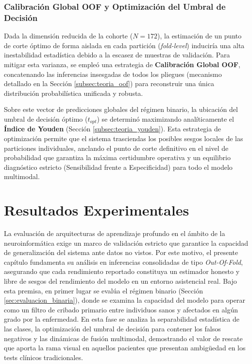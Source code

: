 \documentclass[12pt, oneside, english, spanish]{book}
\begin{document}
\subsection{Calibración Global OOF y Optimización del Umbral de Decisión} \label{subsec:calibracion_binaria}

Dada la dimensión reducida de la cohorte ($N=172$), la estimación de un punto de corte óptimo de forma aislada en cada partición (\textit{fold-level}) induciría una alta inestabilidad estadística debido a la escasez de muestras de validación. Para mitigar esta varianza, se empleó una estrategia de \textbf{Calibración Global OOF}, concatenando las inferencias insesgadas de todos los pliegues (mecanismo detallado en la Sección \ref{subsec:teoria_oof}) para reconstruir una única distribución probabilística unificada y robusta.

Sobre este vector de predicciones globales del régimen binario, la ubicación del umbral de decisión óptimo ($t_{opt}$) se determinó maximizando analíticamente el \textbf{Índice de Youden} (Sección \ref{subsec:teoria_youden}). Esta estrategia de optimización permite que el sistema trasciendas los posibles sesgos locales de las particiones individuales, anclando el punto de corte definitivo en el nivel de probabilidad que garantiza la máxima certidumbre operativa y un equilibrio diagnóstico estricto (Sensibilidad frente a Especificidad) para todo el modelo multimodal.

\chapter{Resultados Experimentales} \label{chap:resultados}

La evaluación de arquitecturas de aprendizaje profundo en el ámbito de la neuroinformática exige un marco de validación estricto que garantice la capacidad de generalización del sistema ante datos no vistos. Por este motivo, el presente capítulo fundamenta su análisis en inferencias consolidadas de tipo \textit{Out-Of-Fold}, asegurando que cada rendimiento reportado constituya un estimador honesto y libre de sesgos del rendimiento del modelo en un entorno asistencial real. Bajo esta premisa, en primer lugar se evalúa el régimen binario (Sección \ref{sec:evaluacion_binaria}), donde se examina la capacidad del modelo para operar como un filtro de cribado primario entre individuos sanos y afectados en algún grado por la enfermedad. En esta fase se analiza la separabilidad estadística de las clases, la optimización del umbral de decisión para contener los falsos negativos y las dinámicas de fusión multimodal, demostrando el valor de rescate que aporta la rama visual en aquellos pacientes que presentan ambigüedad en los tests clínicos tradicionales.
\end{document}
